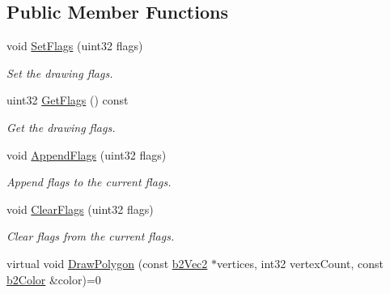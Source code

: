 \subsection*{Public Member Functions}
\begin{DoxyCompactItemize}
\item 
void \hyperlink{classb2_draw_ac2bbe31595478690e44de4ff1e7f347e}{Set\+Flags} (uint32 flags)\hypertarget{classb2_draw_ac2bbe31595478690e44de4ff1e7f347e}{}\label{classb2_draw_ac2bbe31595478690e44de4ff1e7f347e}

\begin{DoxyCompactList}\small\item\em Set the drawing flags. \end{DoxyCompactList}\item 
uint32 \hyperlink{classb2_draw_acadab1a12ec06541814f6118950aa998}{Get\+Flags} () const \hypertarget{classb2_draw_acadab1a12ec06541814f6118950aa998}{}\label{classb2_draw_acadab1a12ec06541814f6118950aa998}

\begin{DoxyCompactList}\small\item\em Get the drawing flags. \end{DoxyCompactList}\item 
void \hyperlink{classb2_draw_acc2fd4648ee0a65574770c64528f7166}{Append\+Flags} (uint32 flags)\hypertarget{classb2_draw_acc2fd4648ee0a65574770c64528f7166}{}\label{classb2_draw_acc2fd4648ee0a65574770c64528f7166}

\begin{DoxyCompactList}\small\item\em Append flags to the current flags. \end{DoxyCompactList}\item 
void \hyperlink{classb2_draw_afc240b71f4ba8c17440d6ed526d4e22e}{Clear\+Flags} (uint32 flags)\hypertarget{classb2_draw_afc240b71f4ba8c17440d6ed526d4e22e}{}\label{classb2_draw_afc240b71f4ba8c17440d6ed526d4e22e}

\begin{DoxyCompactList}\small\item\em Clear flags from the current flags. \end{DoxyCompactList}\item 
virtual void \hyperlink{classb2_draw_acd5427d1d2e7d19f1b34ad3620134d28}{Draw\+Polygon} (const \hyperlink{structb2_vec2}{b2\+Vec2} $\ast$vertices, int32 vertex\+Count, const \hyperlink{structb2_color}{b2\+Color} \&color)=0\hypertarget{classb2_draw_acd5427d1d2e7d19f1b34ad3620134d28}{}\label{classb2_draw_acd5427d1d2e7d19f1b34ad3620134d28}


\end{DoxyCompactItemize}
